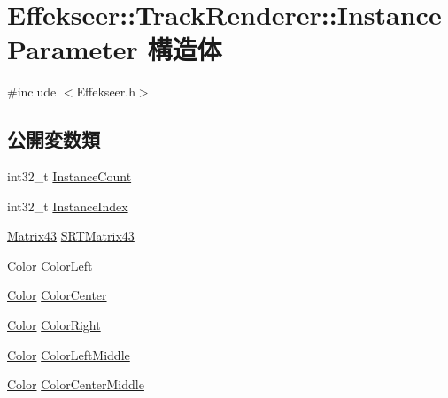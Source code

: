 \hypertarget{struct_effekseer_1_1_track_renderer_1_1_instance_parameter}{}\section{Effekseer\+:\+:Track\+Renderer\+:\+:Instance\+Parameter 構造体}
\label{struct_effekseer_1_1_track_renderer_1_1_instance_parameter}


{\ttfamily \#include $<$Effekseer.\+h$>$}

\subsection*{公開変数類}
\begin{DoxyCompactItemize}
\item 
int32\+\_\+t \mbox{\hyperlink{struct_effekseer_1_1_track_renderer_1_1_instance_parameter_a542da749854a863c183c929ca3e48eba}{Instance\+Count}}
\item 
int32\+\_\+t \mbox{\hyperlink{struct_effekseer_1_1_track_renderer_1_1_instance_parameter_ad77761657310a00233ad2ae14d9a2274}{Instance\+Index}}
\item 
\mbox{\hyperlink{struct_effekseer_1_1_matrix43}{Matrix43}} \mbox{\hyperlink{struct_effekseer_1_1_track_renderer_1_1_instance_parameter_a4e8ec23f938f7d0dc9286c808a91cbe3}{S\+R\+T\+Matrix43}}
\item 
\mbox{\hyperlink{struct_effekseer_1_1_color}{Color}} \mbox{\hyperlink{struct_effekseer_1_1_track_renderer_1_1_instance_parameter_a54e1bf40974b279988d94a208db90b11}{Color\+Left}}
\item 
\mbox{\hyperlink{struct_effekseer_1_1_color}{Color}} \mbox{\hyperlink{struct_effekseer_1_1_track_renderer_1_1_instance_parameter_a6aec16fb81faff1c49ff32c6c2e52a84}{Color\+Center}}
\item 
\mbox{\hyperlink{struct_effekseer_1_1_color}{Color}} \mbox{\hyperlink{struct_effekseer_1_1_track_renderer_1_1_instance_parameter_a30502a95684ed197a5edf8e61abf18ad}{Color\+Right}}
\item 
\mbox{\hyperlink{struct_effekseer_1_1_color}{Color}} \mbox{\hyperlink{struct_effekseer_1_1_track_renderer_1_1_instance_parameter_acce06002b5ba0ae06022c45324bc11ca}{Color\+Left\+Middle}}
\item 
\mbox{\hyperlink{struct_effekseer_1_1_color}{Color}} \mbox{\hyperlink{struct_effekseer_1_1_track_renderer_1_1_instance_parameter_a8ab50cc1bf148e1c90720e6c5f1b7632}{Color\+Center\+Middle}}

\end{DoxyCompactItemize}
